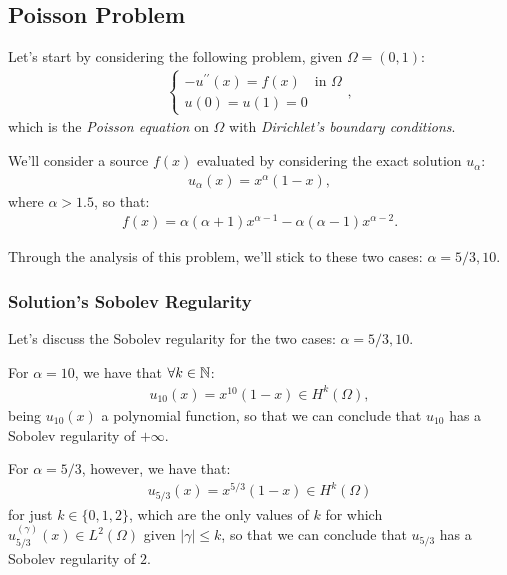 \subsection{Poisson Problem}

Let's start by considering the following problem, given $\Omega = (0, 1)$:
\begin{gather}
	\begin{cases}
		-u^{\prime \prime}(x) = f(x) \quad \text{in } \Omega \\
		u(0) = u(1) = 0
	\end{cases},
\end{gather}
which is the \textit{Poisson equation} on $\Omega$ with \textit{Dirichlet's boundary conditions}.

We'll consider a source $f(x)$ evaluated by considering the exact solution $u_{\alpha}$:
\begin{gather}
	u_{\alpha}(x) = x^{\alpha} (1 - x),
\end{gather}
where $\alpha > 1.5$, so that:
\begin{gather}
	f(x) = \alpha (\alpha + 1) x^{\alpha - 1} - \alpha (\alpha - 1) x^{\alpha - 2}.
\end{gather}

Through the analysis of this problem, we'll stick to these two cases: $\alpha = 5/3, 10$.

\subsubsection{Solution's Sobolev Regularity} \label{sob_regularity}

Let's discuss the Sobolev regularity for the two cases: $\alpha = 5/3, 10$.

For $\alpha = 10$, we have that $\forall k \in \mathbb{N}$:
\begin{gather}
	u_{10}(x) = x^{10} (1 - x) \in H^{k}(\Omega),
\end{gather}
being $u_{10}(x)$ a polynomial function, so that we can conclude that $u_{10}$ has a Sobolev regularity of $+\infty$.

For $\alpha = 5/3$, however, we have that:
\begin{gather}
	u_{5/3}(x) = x^{5/3} (1 - x) \in H^{k}(\Omega)
\end{gather}
for just $k \in \{0, 1, 2\}$, which are the only values of $k$ for which $u_{5/3}^{(\gamma)}(x) \in L^2(\Omega)$ given $\lvert \gamma \rvert \le k$, so that we can conclude that $u_{5/3}$ has a Sobolev regularity of $2$.

